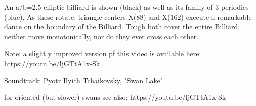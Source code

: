 An a/b=2.5 elliptic billiard is shown (black) as well as its family of 3-periodics (blue). As these rotate, triangle centers X(88) and X(162) execute a remarkable dance on the boundary of the Billiard. Tough both cover the entire Billiard, neither move monotonically, nor do they ever cross each other.

Note: a slightly improved version pf this video is available here: https://youtu.be/ljGTtA1x-Sk

Soundtrack: Pyotr Ilyich Tchaikovsky, "Swan Lake"

for oriented (but slower) swans see also: https://youtu.be/ljGTtA1x-Sk